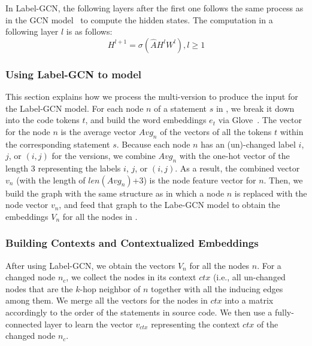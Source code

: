 
In Label-GCN, the following layers after the first one follows the
same process as in the GCN model~\cite{yi} to compute the hidden
states. The computation in a following layer $l$ is as follows:
\begin{equation}\label{eq4}
	H^{l+1} = \sigma (\hat{A}H^lW^l), l \geq 1 
\end{equation}

\subsubsection{{\bf Using Label-GCN to model {\mvpdg}}}
\label{sec:preprocess}
This section explains how we process the multi-version {\mvpdg} to
produce the input for the Label-GCN model. For each node $n$ of a
statement $s$ in {\mvpdg}, we break it down into the code tokens $t$,
and build the word embeddings $e_t$ via Glove~\cite{yi}. The vector
for the node $n$ is the average vector $Avg_n$ of the vectors of all
the tokens $t$ within the corresponding statement $s$. Because each
node $n$ has an (un)-changed label $i$, $j$, or $(i,j)$ for the
versions, we combine $Avg_n$ with the one-hot vector of the length 3
representing the labels $i$, $j$, or $(i,j)$. As a result, the
combined vector $v_n$ (with the length of $len(Avg_n)$+3) is the node
feature vector for $n$. Then, we build the graph with the same
structure as {\mvpdg} in which a node $n$ is replaced with the node
vector $v_n$, and feed that graph to the Labe-GCN model to obtain the
embeddings $V_n$ for all the nodes in {\mvpdg}.


\subsubsection{Building Contexts and Contextualized Embeddings}
After using Label-GCN, we obtain the vectors $V_n$ for all the nodes
$n$. For a changed node $n_c$, we collect the nodes in its context
$ctx$ (i.e., all un-changed nodes that are the $k$-hop neighbor of $n$
together with all the inducing edges among them. We merge all the
vectors for the nodes in $ctx$ into a matrix accordingly to the order
of the statements in source code. We then use a fully-connected layer
to learn the vector $v_{ctx}$ representing the context $ctx$ of the
changed node $n_c$.

